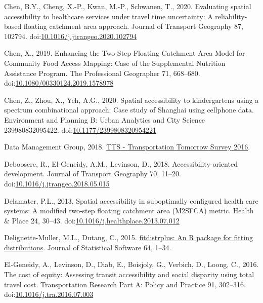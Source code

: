 \documentclass[]{elsarticle} %
\newlength{\cslhangindent}
\newlength{\cslentryspacingunit} %
\newenvironment{CSLReferences}[2] %
 {%
  \setlength{\parindent}{0pt}
  \ifodd #1
  \let\oldpar\par
  \def\par{\hangindent=\cslhangindent\oldpar}
  \fi
  \setlength{\parskip}{#2\cslentryspacingunit}
 }%
 {}
\begin{document}
\begin{CSLReferences}{1}{0}
\leavevmode{}%
Chen, B.Y., Cheng, X.-P., Kwan, M.-P., Schwanen, T., 2020. Evaluating
spatial accessibility to healthcare services under travel time
uncertainty: {A} reliability-based floating catchment area approach.
Journal of Transport Geography 87, 102794.
doi:\href{https://doi.org/10.1016/j.jtrangeo.2020.102794}{10.1016/j.jtrangeo.2020.102794}

\leavevmode{}%
Chen, X., 2019. Enhancing the {Two}-{Step} {Floating} {Catchment} {Area}
{Model} for {Community} {Food} {Access} {Mapping}: {Case} of the
{Supplemental} {Nutrition} {Assistance} {Program}. The Professional
Geographer 71, 668--680.
doi:\href{https://doi.org/10.1080/00330124.2019.1578978}{10.1080/00330124.2019.1578978}

\leavevmode{}%
Chen, Z., Zhou, X., Yeh, A.G., 2020. Spatial accessibility to
kindergartens using a spectrum combinational approach: {Case} study of
{Shanghai} using cellphone data. Environment and Planning B: Urban
Analytics and City Science 239980832095422.
doi:\href{https://doi.org/10.1177/2399808320954221}{10.1177/2399808320954221}

\leavevmode{}%
Data Management Group, 2018.
\href{http://dmg.utoronto.ca/transportation-tomorrow-survey/tts-introduction}{{TTS}
- {Transportation} {Tomorrow} {Survey} 2016}.

\leavevmode{}%
Deboosere, R., El-Geneidy, A.M., Levinson, D., 2018.
Accessibility-oriented development. Journal of Transport Geography 70,
11--20.
doi:\href{https://doi.org/10.1016/j.jtrangeo.2018.05.015}{10.1016/j.jtrangeo.2018.05.015}

\leavevmode{}%
Delamater, P.L., 2013. Spatial accessibility in suboptimally configured
health care systems: A modified two-step floating catchment area
(M2SFCA) metric. Health \& Place 24, 30--43.
doi:\href{https://doi.org/10.1016/j.healthplace.2013.07.012}{10.1016/j.healthplace.2013.07.012}

\leavevmode{}%
Delignette-Muller, M.L., Dutang, C., 2015.
\href{https://www.jstatsoft.org/article/view/v064i04}{{fitdistrplus}: An
{R} package for fitting distributions}. Journal of Statistical Software
64, 1--34.

\leavevmode{}%
El-Geneidy, A., Levinson, D., Diab, E., Boisjoly, G., Verbich, D.,
Loong, C., 2016. The cost of equity: {Assessing} transit accessibility
and social disparity using total travel cost. Transportation Research
Part A: Policy and Practice 91, 302--316.
doi:\href{https://doi.org/10.1016/j.tra.2016.07.003}{10.1016/j.tra.2016.07.003}


\end{CSLReferences}
\end{document}
